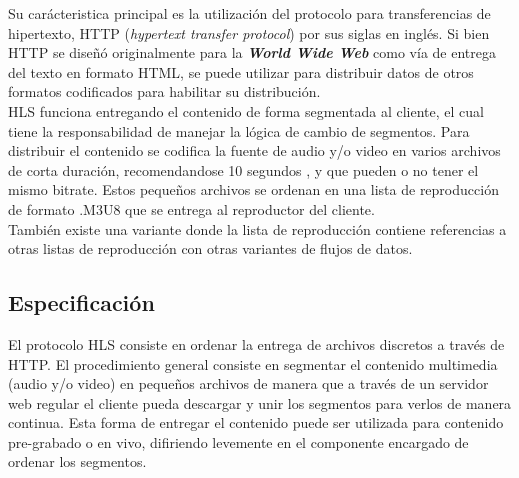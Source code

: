 Su carácteristica principal es la utilización del protocolo para transferencias de hipertexto, HTTP (\textit{hypertext transfer protocol}) por sus siglas en inglés. Si bien HTTP se diseñó originalmente para la \textit{\textbf{World Wide Web}} como vía de entrega del texto en formato HTML, se puede utilizar para distribuir datos de otros formatos codificados para habilitar su distribución.\\

HLS funciona entregando el contenido de forma segmentada al cliente, el cual tiene la responsabilidad de manejar la lógica de cambio de segmentos. Para distribuir el contenido se codifica la fuente de audio y/o video en varios archivos de corta duración, recomendandose 10 segundos \cite{bib:tensec-targetduration}, y que pueden o no tener el mismo bitrate. Estos pequeños archivos se ordenan en una lista de reproducción de formato .M3U8 que se entrega al reproductor del cliente. \\

También existe una variante donde la lista de reproducción contiene referencias a otras listas de reproducción con otras variantes de flujos de datos. \\

	\subsection{Especificación}
		El protocolo HLS consiste en ordenar la entrega de archivos discretos a través de HTTP.
		El procedimiento general consiste en segmentar el contenido multimedia (audio y/o video) en pequeños archivos de manera que a través de un servidor web regular el cliente pueda descargar y unir los segmentos para verlos de manera continua. Esta forma de entregar el contenido puede ser utilizada para contenido pre-grabado o en vivo, difiriendo levemente en el componente encargado de ordenar los segmentos.\\
		
